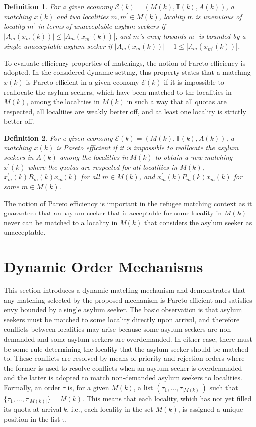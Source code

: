 \documentclass[12pt,fleqn]{article}
\newtheorem{definition}{Definition}
\begin{document}
\begin{definition}\rm\label{DEF:1-Envy_UNACC}
For a given economy $\mathcal{E}(k)=(M(k),\mathbb{T}(k),A(k))$, a matching $x(k)$ and two localities $m,m^\prime\in M(k)$, locality $m$ is unenvious of locality $m^\prime$ in terms of unacceptable asylum seekers if $|A_m^-(x_m(k))|\leq |A_m^-(x_{m^\prime}(k))|$; and $m$'s envy towards $m^\prime$ is bounded by a single unacceptable asylum seeker if $|A_m^-(x_m(k))|-1\leq |A_m^-(x_{m^\prime}(k))|$.
\end{definition}
\noindent To evaluate efficiency properties of matchings, the notion of Pareto efficiency is adopted. In the considered dynamic setting, this property states that a matching $x(k)$ is Pareto efficient in a given economy $\mathcal{E}(k)$ if it is impossible to reallocate the asylum seekers, which have been matched to the localities in $M(k)$, among the localities in $M(k)$ in such a way that all quotas are respected, all localities are weakly better off, and at least one locality is strictly better off.
\begin{definition}\rm\label{DEF:Efficiency}
For a given economy $\mathcal{E}(k)=(M(k),\mathbb{T}(k),A(k))$, a matching $x(k)$ is Pareto efficient if it is impossible to reallocate the asylum seekers in $A(k)$ among the localities in $M(k)$ to obtain a new matching $x^\prime(k)$ where the quotas are respected for all localities in $M(k)$, $x_m^\prime(k)R_m(k) x_m(k)$ for all $m\in M(k)$, and $x_m^\prime(k)P_m(k) x_m(k)$ for some $m\in M(k)$.
\end{definition}
\noindent The notion of Pareto efficiency is important in the refugee matching context as it guarantees that an asylum seeker that is acceptable for some locality in $M(k)$ never can be matched to a locality in $M(k)$ that considers the asylum seeker as unacceptable.

\section{Dynamic Order Mechanisms}\label{SEC:Structure_Mechanisms}
This section introduces a dynamic matching mechanism and demonstrates that any matching selected by the proposed mechanism is Pareto efficient and satisfies envy bounded by a single asylum seeker. The basic observation is that asylum seekers must be matched to some locality directly upon arrival, and therefore conflicts between localities may arise because some asylum seekers are non-demanded and some asylum seekers are overdemanded. In either case, there must be some rule determining the locality that the asylum seeker should be matched to. These conflicts are resolved by means of priority and rejection orders where the former is used to resolve conflicts when an asylum seeker is overdemanded and the latter is adopted to match non-demanded asylum seekers to localities. Formally, an order $\tau$ is, for a given $M(k)$, a list $(\tau_1,\ldots,\tau_{|M(k)|})$ such that $\{\tau_1,\ldots, \tau_{|M(k)|}\}=M(k)$. This means that each locality, which has not yet filled its quota at arrival $k$, i.e., each locality in the set $M(k)$, is assigned a unique position in the list $\tau$.
\end{document}
